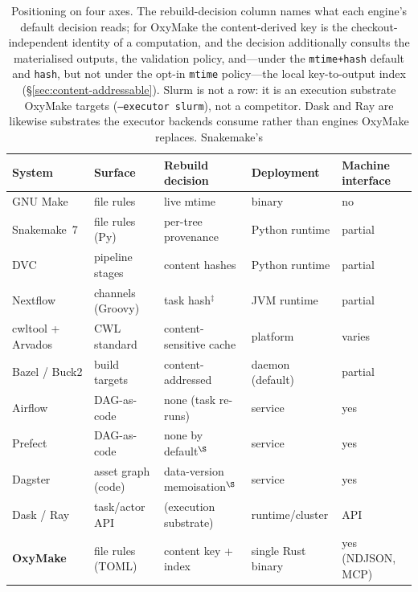 \documentclass[12pt,a4paper]{article}
\newcommand{\code}[1]{{\texttt{\small\color{inlinecode}#1}}}
\begin{document}
\begin{table}[htbp]
\centering\footnotesize\setlength{\tabcolsep}{4pt}
\begin{tabular}{@{}lllll@{}}
\toprule
\textbf{System} & \textbf{Surface} & \textbf{Rebuild decision} & \textbf{Deployment} & \textbf{Machine interface} \\
\midrule
GNU Make            & file rules       & live mtime            & binary            & no \\
Snakemake~7         & file rules (Py)  & per-tree provenance   & Python runtime    & partial \\
DVC                 & pipeline stages  & content hashes        & Python runtime    & partial \\
Nextflow            & channels (Groovy)& task hash$^{\ddagger}$  & JVM runtime       & partial \\
cwltool + Arvados   & CWL standard     & content-sensitive cache & platform        & varies \\
Bazel / Buck2       & build targets    & content-addressed     & daemon (default)  & partial \\
Airflow             & DAG-as-code      & none (task re-runs)   & service           & yes \\
Prefect             & DAG-as-code      & none by default$^{\S}$ & service           & yes \\
Dagster             & asset graph (code)& data-version memoisation$^{\S}$ & service      & yes \\
Dask / Ray          & task/actor API   & (execution substrate) & runtime/cluster   & API \\
\textbf{OxyMake}    & file rules (TOML)& content key + index   & single Rust binary & yes (NDJSON, MCP) \\
\bottomrule
\end{tabular}
\caption{Positioning on four axes. The rebuild-decision column names
  what each engine's default decision reads; for OxyMake the
  content-derived key is the checkout-independent identity of a
  computation, and the decision additionally consults the materialised
  outputs, the validation policy, and---under the \code{mtime+hash}
  default and \code{hash}, but not under the opt-in \code{mtime}
  policy---the local key-to-output index
  (\S\ref{sec:content-addressable}). Slurm is not a row: it is an
  execution substrate OxyMake targets (\code{--executor slurm}), not a
  competitor. Dask and Ray are likewise substrates the executor
  backends consume rather than engines OxyMake replaces. Snakemake's
}
\end{table}
\end{document}
